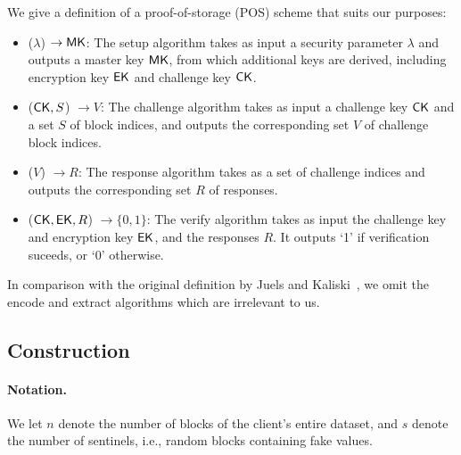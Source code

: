 We give a definition of a proof-of-storage (POS) scheme that suits our purposes:
\begin{itemize}
\item \Setup($\lambda$) $\rightarrow \textsf{\textup{MK}}$: The setup algorithm takes as input a security parameter $\lambda$ and outputs a master key $\textsf{\textup{MK}}$, from which additional keys are derived, including encryption key $\textsf{\textup{EK}}$ and challenge key $\textsf{\textup{CK}}$.

\item \Challenge($\textsf{\textup{CK}}, S$) $\rightarrow V$: The challenge algorithm takes as input a challenge key $\textsf{\textup{CK}}$ and a set $S$ of block indices, and outputs the corresponding set $V$ of challenge block indices.

\item \Response($V$) $\rightarrow R$: The response algorithm takes as a set of challenge indices and outputs the corresponding set $R$ of responses.

\item \Verify($\textsf{\textup{CK}}, \textsf{\textup{EK}}, R$) $\rightarrow \{0,1\}$: The verify algorithm takes as input the challenge key and encryption key $\textsf{\textup{EK}}$, and the responses $R$. It outputs `1' if verification suceeds, or `0' otherwise.
\end{itemize}

In comparison with the original definition by Juels and Kaliski~\cite{JK07}, we omit the encode and extract algorithms which are irrelevant to us.

\subsection{Construction} \label{sect:pos-construction}

\paragraph{Notation.}
We let $n$ denote the number of blocks of the client's entire dataset, and $s$ denote the number of sentinels, i.e., random blocks containing fake values.



